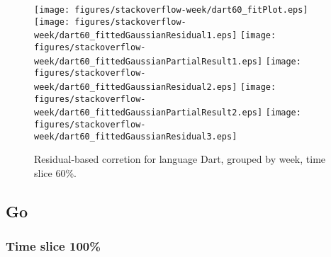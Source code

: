 \begin{figure}[hb]
\centering
{}
{\texttt{[image: figures/stackoverflow-week/dart60\_fitPlot.eps]}}
{\texttt{[image: figures/stackoverflow-week/dart60\_fittedGaussianResidual1.eps]}}
{\texttt{[image: figures/stackoverflow-week/dart60\_fittedGaussianPartialResult1.eps]}}
{\texttt{[image: figures/stackoverflow-week/dart60\_fittedGaussianResidual2.eps]}}
{\texttt{[image: figures/stackoverflow-week/dart60\_fittedGaussianPartialResult2.eps]}}
{\texttt{[image: figures/stackoverflow-week/dart60\_fittedGaussianResidual3.eps]}}
\caption{Residual-based corretion for language Dart, grouped by week, time slice 60\%.}
\end{figure}


\clearpage 
\newpage 


\subsection{Go}

\FloatBarrier

\subsubsection{Time slice 100\%}

